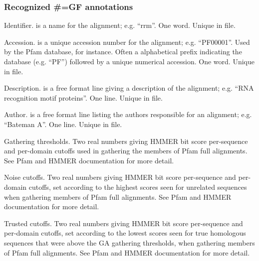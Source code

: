 \subsubsection{Recognized \#=GF annotations}
\begin{wideitem}
\item [\emprog{ID  <s>}] 
        Identifier.  is a name for the alignment;
        e.g. ``rrm''. One word. Unique in file.

\item [\emprog{AC  <s>}]
        Accession.  is a unique accession number for the
        alignment; e.g. 
        ``PF00001''. Used by the Pfam database, for instance. 
        Often a alphabetical prefix indicating the database
        (e.g. ``PF'') followed by a unique numerical accession.
        One word. Unique in file. 
        
\item [\emprog{DE  <s>}]
        Description.  is a free format line giving
        a description of the alignment; e.g.
        ``RNA recognition motif proteins''. One line. Unique in file.

\item [\emprog{AU  <s>}]
        Author.  is a free format line listing the 
        authors responsible for an alignment; e.g. 
        ``Bateman A''. One line. Unique in file.

\item [\emprog{GA  <f> <f>}]
        Gathering thresholds. Two real numbers giving HMMER bit score
        per-sequence and per-domain cutoffs used in gathering the
        members of Pfam full alignments. See Pfam and HMMER
        documentation for more detail.
        
\item [\emprog{NC  <f> <f>}]
        Noise cutoffs. Two real numbers giving HMMER bit score
        per-sequence and per-domain cutoffs, set according to the
        highest scores seen for unrelated sequences when gathering
        members of Pfam full alignments. See Pfam and HMMER
        documentation for more detail.

\item [\emprog{TC  <f> <f>}]
        Trusted cutoffs. Two real numbers giving HMMER bit score
        per-sequence and per-domain cutoffs, set according to the
        lowest scores seen for true homologous sequences that
        were above the GA gathering thresholds, when gathering
        members of Pfam full alignments. See Pfam and HMMER
        documentation for more detail.
\end{wideitem}


